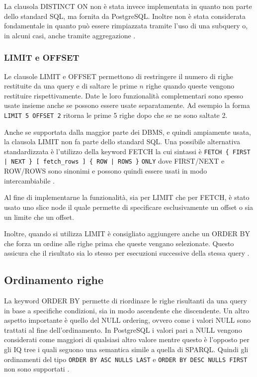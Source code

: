La clausola DISTINCT ON non è stata invece implementata in quanto non parte dello standard SQL, ma fornita da PostgreSQL. Inoltre non è stata considerata fondamentale in quanto
può essere rimpiazzata tramite l'uso di una subquery o, in alcuni casi, anche tramite aggregazione \cite{PGDistinct}.
\subsubsection*{LIMIT e OFFSET}
Le clausole LIMIT e OFFSET permettono di restringere il numero di righe restituite da una query e di saltare le prime $n$ righe quando queste vengono restituire rispettivamente.
Date le loro funzionalità complementari sono spesso usate insieme anche se possono essere usate separatamente.
Ad esempio la forma \verb+LIMIT 5 OFFSET 2+ ritorna le prime 5 righe dopo che se ne sono saltate 2.

Anche se supportata dalla maggior parte dei DBMS, e quindi ampiamente usata, la clausola LIMIT non fa parte dello standard SQL. Una possibile alternativa standardizzata è l'utilizzo
della keyword FETCH la cui sintassi è \verb+FETCH { FIRST | NEXT } [ fetch_rows ] { ROW | ROWS }+ \verb+ONLY+ dove FIRST/NEXT e ROW/ROWS sono sinonimi e possono quindi essere usati
in modo intercambiabile \cite{Fetch}.

Al fine di implementarne la funzionalità, sia per LIMIT che per FETCH, è stato usato uno slice node il quale permette di specificare esclusivamente un offset o sia
un limite che un offset.

Inoltre, quando si utilizza LIMIT è consigliato aggiungere anche un ORDER BY che forza un ordine alle righe prima che queste vengano selezionate. Questo assicura che il risultato sia 
lo stesso per esecuzioni successive della stessa query \cite{PGLimit}.

\subsection{Ordinamento righe}
La keyword ORDER BY permette di riordinare le righe risultanti da una query in base a specifiche condizioni, sia in modo ascendente che discendente. Un altro aspetto importante è quello del
NULL ordering, ovvero come i valori NULL sono trattati al fine dell'ordinamento. In PostgreSQL i valori pari a NULL vengono considerati come maggiori di qualsiasi altro valore mentre questo
è l'opposto per gli IQ tree i quali seguono una semantica simile a quella di SPARQL. Quindi gli ordinamenti del tipo \verb+ORDER BY ASC NULLS LAST+ e \verb+ORDER BY DESC NULLS FIRST+
non sono supportati \cite{PGOrderBY}.

